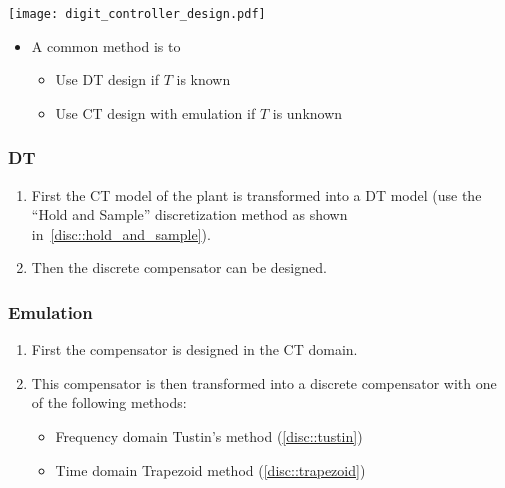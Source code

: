 \begin{center}
    \texttt{[image: digit\_controller\_design.pdf]}
\end{center}

\newpar{}

\begin{itemize}
    \item A common method is to
          \begin{itemize}
              \item Use DT design if $T$ is known
              \item Use CT design with emulation if $T$ is unknown
          \end{itemize}
\end{itemize}

\subsubsection{DT}
\begin{enumerate}
    \item First the CT model of the plant is transformed into a DT model (use the ``Hold and Sample'' discretization method as shown in~\ref{disc::hold_and_sample}).
    \item Then the discrete compensator can be designed.
\end{enumerate}

\subsubsection{Emulation}
\begin{enumerate}
    \item First the compensator is designed in the CT domain.
    \item This compensator is then transformed into a discrete compensator with one of the following methods:
          \begin{itemize}
              \item Frequency domain \textrightarrow{} Tustin's method (\ref{disc::tustin})
              \item Time domain \textrightarrow{} Trapezoid method (\ref{disc::trapezoid})
          \end{itemize}
\end{enumerate}
